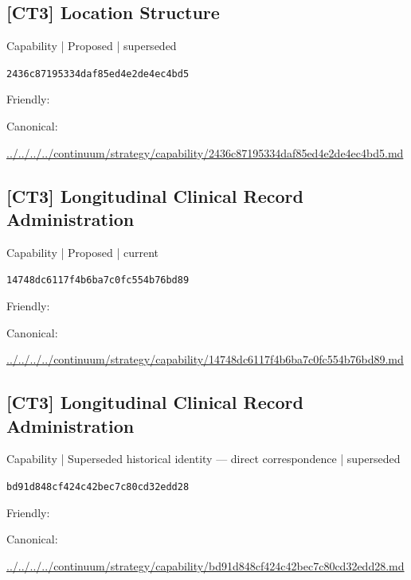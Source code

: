 \documentclass[10pt,a4paper]{article}
\begin{document}
\subsection*{[CT3] Location Structure}
{\small Capability | Proposed | superseded}\par
\texttt{2436c87195334daf85ed4e2de4ec4bd5}\par
Friendly: \par
Canonical: \par
{\footnotesize\url{../../../../continuum/strategy/capability/2436c87195334daf85ed4e2de4ec4bd5.md}}\par
\subsection*{[CT3] Longitudinal Clinical Record Administration}
{\small Capability | Proposed | current}\par
\texttt{14748dc6117f4b6ba7c0fc554b76bd89}\par
Friendly: \par
Canonical: \par
{\footnotesize\url{../../../../continuum/strategy/capability/14748dc6117f4b6ba7c0fc554b76bd89.md}}\par
\subsection*{[CT3] Longitudinal Clinical Record Administration}
{\small Capability | Superseded historical identity — direct correspondence | superseded}\par
\texttt{bd91d848cf424c42bec7c80cd32edd28}\par
Friendly: \par
Canonical: \par
{\footnotesize\url{../../../../continuum/strategy/capability/bd91d848cf424c42bec7c80cd32edd28.md}}\par
\end{document}
